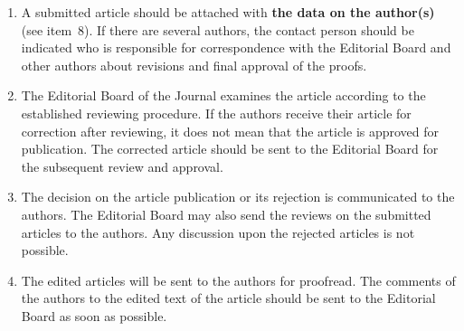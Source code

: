 {{\begin{enumerate}[1.]
{\bfseries\textit{Agreement on the transfer of rights to publish:}}

``\textit{We, the undersigned authors of the manuscript ``\ldots'', pass to the 
Founder and the Editorial Board of the Journal ``Informatics and Applications'' 
the nonexclusive right to publish the manuscript of the article in Russian (or 
in English) in both print and electronic versions of the Journal. We affirm 
that this publication does not violate the Copyright of other persons or 
organizations.}

\textit{Author(s) signature(s): (name(s), address(es), date).}

This agreement should be submitted in paper form or in the form of a scanned copy (signed by 
the authors). 

\item
A submitted article should be attached with \textbf{the data on the author(s)} (see item~8). If 
there are several authors, the contact person should be indicated who is responsible for 
correspondence with the Editorial Board and other authors about revisions and final approval
of the proofs.\\[-13.5pt]

\item The Editorial Board of the Journal examines the article according to the established 
reviewing procedure. If the authors receive their article for correction after reviewing, it does not 
mean that the article is approved for publication. The corrected article should be sent to the 
Editorial Board for the subsequent review and approval.\\[-13.5pt]

\item The decision on the article publication or its rejection is communicated to the authors. The 
Editorial Board may also send the reviews on the submitted articles to the authors. Any 
discussion upon the rejected articles is not possible.\\[-13.5pt]

\item The edited articles will be sent to the authors for proofread. The comments of the authors 
to the edited text of the article should be sent to the Editorial Board as soon as possible.\\[-13.5pt]


\end{enumerate}}}
